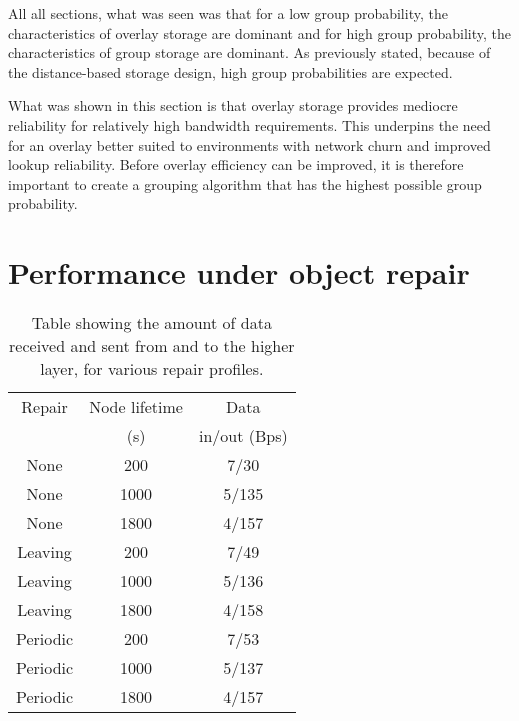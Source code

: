 All all sections, what was seen was that for a low group probability, the characteristics of overlay storage are dominant and for high group probability, the characteristics of group storage are dominant. As previously stated, because of the distance-based storage design, high group probabilities are expected.

What was shown in this section is that overlay storage provides mediocre reliability for relatively high bandwidth requirements. This underpins the need for an overlay better suited to environments with network churn and improved lookup reliability. Before overlay efficiency can be improved, it is therefore important to create a grouping algorithm that has the highest possible group probability.

\section{Performance under object repair}


\begin{table}[htbp]
\centering
\begin{tabular}{|c|c|c|}
\hline
Repair   &Node lifetime& Data\\
         &     (s)     &in/out (Bps)\\
\hline
None     & 200         &     7/30\\
None     & 1000        &     5/135\\
None     & 1800        &     4/157\\
Leaving  & 200         &     7/49\\
Leaving  & 1000        &     5/136\\
Leaving  & 1800        &     4/158\\
Periodic & 200         &     7/53\\
Periodic & 1000        &     5/137\\
Periodic & 1800        &     4/157\\
\hline
\end{tabular}
\caption{Table showing the amount of data received and sent from and to the higher layer, for various repair profiles.}
\label{tab_repair_data}
\end{table}

